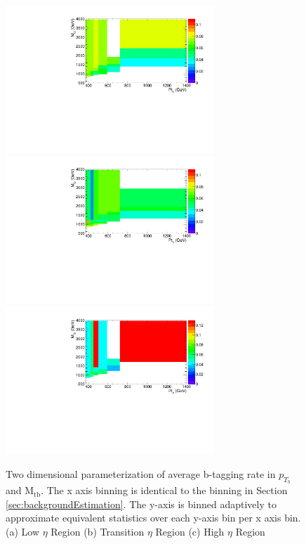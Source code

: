 \begin{figure}[htcb]
\begin{center}
\includegraphics[width=0.7\textwidth]{AN-13-004/figs/TagrateEta1SB2dSB1.pdf}
\includegraphics[width=0.7\textwidth]{AN-13-004/figs/TagrateEta2SB2dSB1.pdf}
\includegraphics[width=0.7\textwidth]{AN-13-004/figs/TagrateEta3SB2dSB1.pdf}
\caption{
Two dimensional parameterization of average b-tagging rate in $p_{T_{b}}$ and $\mathrm{M_{tb}}$.  The x axis binning is identical to the binning in Section \ref{sec:backgroundEstimation}.  
The y-axis is binned adaptively to approximate equivalent statistics over each y-axis bin per x axis bin. 
(a) Low $\eta$ Region
(b) Transition $\eta$ Region
(c) High $\eta$ Region
}
\label{figs:sb2deta}
\end{center}
\end{figure}

